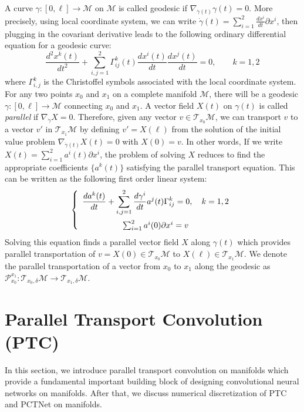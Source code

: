 \documentclass[10pt,twocolumn,letterpaper]{article}
\def\M{\mathcal{M}}
\def\T{\mathcal{T}}
\def\PT{\mathcal{P}}
\begin{document}
A curve $\gamma:[0,\ell] \rightarrow \M$ on $\M$ is called geodesic if $\nabla_{\dot \gamma(t)} \gamma(t) = 0$. More precisely, using local coordinate system, we can write $\displaystyle \dot \gamma (t) = \sum_{i=1}^2 \frac{dx^i}{dt}\partial x^i$, then plugging in the covariant derivative leads to the following ordinary differential equation for a geodesic curve:
\begin{equation}\label{Geodesic Equation}
\frac{d^2x^k(t)}{dt^2} + \sum_{i,j=1}^2 \Gamma^k_{ij}(t) \frac{dx^i(t)}{dt} \frac{dx^j(t)}{dt} = 0, \qquad k = 1, 2
\end{equation}
where $\Gamma^k_{i,j}$ is the Christoffel symbols associated with the local coordinate system.
For any two points $x_0$ and $x_1$ on a complete manifold $\M$, there will be a geodesic $\gamma:[0,\ell] \rightarrow\M$ connecting $x_0$ and $x_1$.
A vector field $X(t)$ on $\gamma(t)$ is called {\it parallel}  if $\nabla_{\dot \gamma} X = 0$. Therefore, given any vector $v \in \T_{x_0} \M$,  we can transport $v$ to a vector $v'$ in $\T_{x_1}\M$ by defining $v' = X(\ell)$ from the solution of the initial value problem $\nabla_{\dot \gamma(t)} X(t) = 0$ with $X(0) = v$.
In other words,
If we write $X(t) = \sum_{i=1}^2 a^i(t)\partial x^i$, the problem of solving $X$ reduces to find the appropriate coefficients $\{a^k(t)\}$ satisfying the parallel transport equation. This can be written as the following first order linear system:
\begin{equation}
\left\{\begin{array}{c}
\displaystyle \dfrac{d a^k(t)}{dt} +  \sum_{i,j=1}^2 \dfrac{d \gamma^i}{dt} a^j(t)\Gamma ^k_{ij} = 0, \quad k = 1, 2 \vspace{0.2cm}\\
\sum_{i=1}^2 a^i(0) \partial x^i = v
\end{array}\right.
\end{equation}
Solving this equation finds a parallel vector field $X$ along $\gamma(t)$ which provides parallel transportation of $v = X(0) \in\T_{x_0}\M$ to $X(\ell)\in\T_{x_1}\M$. We denote the parallel transportation of a vector from $x_0$ to $x_1$ along the geodesic as $\PT_{x_0}^{x_1}:\T_{x_0,\delta}\M \rightarrow\T_{x_1,\delta}\M$.


\section{Parallel Transport Convolution (PTC)}
\label{sec:PTC}
In this section, we introduce parallel transport convolution on manifolds which provide a fundamental important building block of designing convolutional neural networks on manifolds. After that, we discuss numerical discretization of PTC and PCTNet on manifolds.
\end{document}
